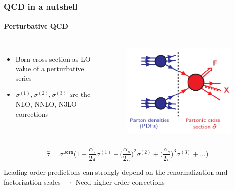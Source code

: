 \documentclass[aspectratio=43]{beamer}
\begin{document}
\begin{frame}

	\frametitle{QCD in a nutshell}
	\framesubtitle{Perturbative QCD}
	
	\begin{columns}
		
		
		\begin{itemize}
			\item Born cross section as LO value of a perturbative series
			\item $\sigma^{(1)}, \sigma^{(2)}, \sigma^{(3)}$ are the NLO, NNLO, N3LO corrections
		\end{itemize}
		
		\begin{figure}[!htb]
			\includegraphics[width = 5 cm]{plots/factorization_3.png}
		\end{figure}
	
	\end{columns}
	
	\begin{equation}
		\hat{\sigma} = \sigma^{\texttt{Born}} \Bigg( 1 +
		\frac{\alpha_{s}}{2\pi} \sigma^{(1)} + 
		\Big(\frac{\alpha_{s}}{2\pi}\Big)^{2} \sigma^{(2)} + 
		\Big(\frac{\alpha_{s}}{2\pi}\Big)^{3} \sigma^{(3)} + ... \Bigg) \nonumber
	\end{equation}
	
	Leading order predictions can strongly depend on the renormalization and factorization scales $\rightarrow$ {\color{red}Need higher order corrections}

\end{frame}

\begin{frame}


\end{frame}
\end{document}
